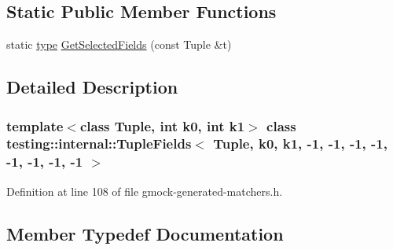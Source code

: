 \subsection*{Static Public Member Functions}
\begin{DoxyCompactItemize}
\item 
static \hyperlink{classtesting_1_1internal_1_1TupleFields_3_01Tuple_00_01k0_00_01k1_00_01-1_00_01-1_00_01-1_00_01-fb5812c507091ce72ac353453b83394d_ad0dd4e84d48ec9a5ef262cf32f6979f9}{type} \hyperlink{classtesting_1_1internal_1_1TupleFields_3_01Tuple_00_01k0_00_01k1_00_01-1_00_01-1_00_01-1_00_01-fb5812c507091ce72ac353453b83394d_aff1691053cc880fe84f27cb6a1c5680f}{Get\+Selected\+Fields} (const Tuple \&t)
\end{DoxyCompactItemize}


\subsection{Detailed Description}
\subsubsection*{template$<$class Tuple, int k0, int k1$>$\newline
class testing\+::internal\+::\+Tuple\+Fields$<$ Tuple, k0, k1, -\/1, -\/1, -\/1, -\/1, -\/1, -\/1, -\/1, -\/1 $>$}



Definition at line 108 of file gmock-\/generated-\/matchers.\+h.



\subsection{Member Typedef Documentation}
\mbox{\label{classtesting_1_1internal_1_1TupleFields_3_01Tuple_00_01k0_00_01k1_00_01-1_00_01-1_00_01-1_00_01-fb5812c507091ce72ac353453b83394d_ad0dd4e84d48ec9a5ef262cf32f6979f9}} 
